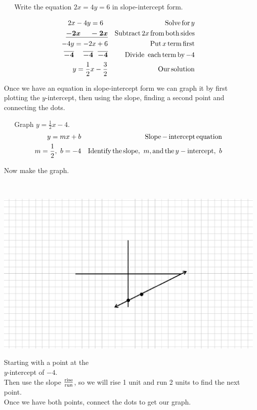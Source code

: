 \begin{example}\label{Lin58}~~~Write the equation $2x=4y=6$ in slope-intercept form.
  
  \begin{eqnarray*}
    2 x - 4 y = 6~~ &  & \operatorname{Solve} \operatorname{for} y\\
    \boldsymbol{\underline{- 2 x ~~~~- 2 x}} &  & \operatorname{Subtract} 2 x \operatorname{from} \operatorname{both}
    \operatorname{sides}\\
    - 4 y = - 2 x + 6 &  & \operatorname{Put} x \operatorname{term} \operatorname{first}\\
    \boldsymbol{\overline{- 4} ~~~~ \overline{- 4} ~~ \overline{- 4}} &  & \operatorname{Divide~}
    \operatorname{each} \operatorname{term} \operatorname{by} - 4\\
    y = \frac{1}{2} x - \frac{3}{2} &  & \operatorname{Our} \operatorname{solution}
  \end{eqnarray*}
\end{example}

 Once we have an equation in slope-intercept form we can graph it by first
plotting the $y$-intercept, then using the slope, finding a second point and
connecting the dots.

\begin{example}\label{Lin59}~~~Graph $y=\displaystyle\frac{1}{2}x-4$.
  \begin{eqnarray*}
    y = m x + b&  & \operatorname{Slope} - \operatorname{intercept} \operatorname{equation}\\
    m = \frac{1}{2},~ b = - 4 &  & \operatorname{Identify} \operatorname{the} \operatorname{slope},~ m, \operatorname{and} \operatorname{the} y - \operatorname{intercept},~ b
  \end{eqnarray*}
  \begin{center}
	Now make the graph.
	\end{center}
	\begin{multicols}{2}~\par
    \includegraphics[scale=.9,bb = 115 65 310 190, clip=true]{II_1_4a-2.eps}
    
     Starting with a point at the \\
		$y$-intercept of $- 4$.\\
    
     Then use the slope $\frac{\operatorname{rise}}{\operatorname{run}}$, so we will rise 1
    unit and run 2 units to find the next point.\\
    
     Once we have both points, connect the dots to get our graph.
  \end{multicols}
\end{example}

